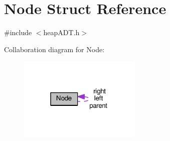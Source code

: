 \hypertarget{structNode}{}\section{Node Struct Reference}
\label{structNode}


{\ttfamily \#include $<$heap\+A\+D\+T.\+h$>$}



Collaboration diagram for Node\+:\nopagebreak
\begin{figure}[H]
\begin{center}
\leavevmode
\includegraphics[width=166pt]{structNode__coll__graph}
\end{center}
\end{figure}
